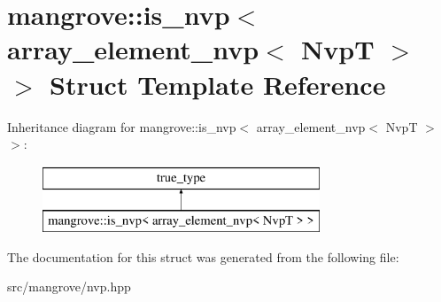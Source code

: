 \hypertarget{structmangrove_1_1is__nvp_3_01array__element__nvp_3_01NvpT_01_4_01_4}{}\section{mangrove\+:\+:is\+\_\+nvp$<$ array\+\_\+element\+\_\+nvp$<$ NvpT $>$ $>$ Struct Template Reference}
\label{structmangrove_1_1is__nvp_3_01array__element__nvp_3_01NvpT_01_4_01_4}
Inheritance diagram for mangrove\+:\+:is\+\_\+nvp$<$ array\+\_\+element\+\_\+nvp$<$ NvpT $>$ $>$\+:\begin{figure}[H]
\begin{center}
\leavevmode
\includegraphics[height=2.000000cm]{structmangrove_1_1is__nvp_3_01array__element__nvp_3_01NvpT_01_4_01_4}
\end{center}
\end{figure}


The documentation for this struct was generated from the following file\+:\begin{DoxyCompactItemize}
\item 
src/mangrove/nvp.\+hpp\end{DoxyCompactItemize}
